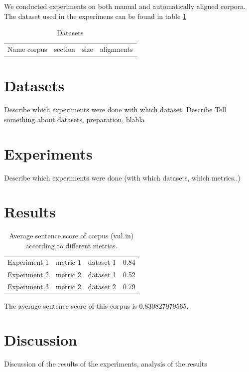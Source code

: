 \documentclass{report}
\theoremstyle{definition}
\theoremstyle{plain}
\begin{document}
We conducted experiments on both manual and automatically aligned corpora. The dataset used in the experimens can be found in table \ref{table:datasets}

\begin{table}\label{table:datasets}
\begin{tabular}{cccc}
Name corpus & section & size & alignments\\
\end{tabular}
\caption{Datasets}
\end{table}

\section{Datasets}

Describe which experiments were done with which dataset. Describe
Tell something about datasets, preparation, blabla

\section{Experiments}

Describe which experiments were done (with which datasets, which metrics..)

\section{Results}

\begin{table}\label{table:scores}
\begin{tabular}{llll}
Experiment 1 & metric 1 & dataset 1 & 0.84\\
Experiment 2 & metric 2 & dataset 1 & 0.52\\
Experiment 3 & metric 2 & dataset 2 & 0.79\\
\end{tabular}
\caption{Average sentence score of corpus (vul in) according to different metrics.}
\end{table}


The average sentence score of this corpus is 0.830827979565.

\section{Discussion}

Discussion of the results of the experiments, analysis of the results
\end{document}
